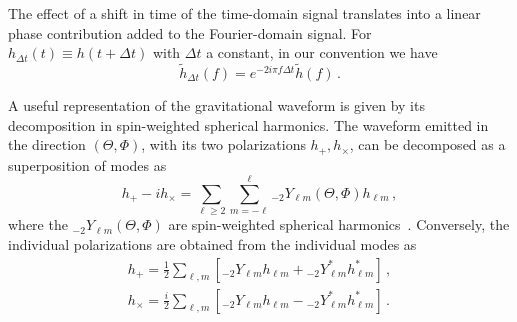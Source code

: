 \documentclass[aps,showpacs,twocolumn,
prd,superscriptaddress,nofootinbib]{revtex4-1}
\newcommand{\be}{\begin{equation}}
\newcommand{\ee}{\end{equation}}
\begin{document}
The effect of a shift in time of the time-domain signal translates into a linear phase contribution added to the Fourier-domain signal. For $h_{\Delta t}(t) \equiv h(t+\Delta t)$ with $\Delta t$ a constant, in our convention we have
\be\label{eq:shifttime}
	\tilde{h}_{\Delta t} (f) = e^{-2i\pi f \Delta t} \tilde{h}(f) \,.
\ee

A useful representation of the gravitational waveform is given by its decomposition in spin-weighted spherical harmonics. The waveform emitted in the direction $(\Theta, \Phi)$, with its two polarizations $h_{+},h_{\times}$, can be decomposed as a superposition of modes as~\cite{Thorne80}
\be\label{eq:defmodes}
	h_{+} - i h_{\times} = \sum\limits_{\ell \geq 2} \sum\limits_{m=-\ell}^{\ell} {}_{-2}Y_{\ell m}(\Theta,\Phi) h_{\ell m} \,,
\ee
where the ${}_{-2}Y_{\ell m}(\Theta,\Phi)$ are spin-weighted spherical harmonics~\cite{Goldberg+67}. Conversely, the individual polarizations are obtained from the individual modes as
\begin{subequations}
\begin{align}
	h_{+} = \frac{1}{2} \sum\limits_{\ell, m} \left[ {}_{-2}Y_{\ell m}h_{\ell m} + {}_{-2}Y_{\ell m}^{*} h_{\ell m}^{*} \right] \,,\\
	h_{\times} = \frac{i}{2} \sum\limits_{\ell, m} \left[ {}_{-2}Y_{\ell m}h_{\ell m} - {}_{-2}Y_{\ell m}^{*} h_{\ell m}^{*} \right] \,.
\end{align}
\end{subequations}
\end{document}
